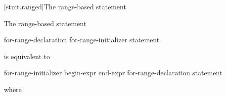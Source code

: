 [stmt.ranged]{The range-based  statement}%

\pnum
The range-based  statement

\begin{ncbnf}
 for-range-declaration \terminal{:} for-range-initializer \terminal{)} statement
\end{ncbnf}

is equivalent to

\begin{ncbnftab}
\terminal{\{}\br
\> for-range-initializer \terminal{;}\br
\> begin-expr \terminal{;}\br
\> end-expr \terminal{;}\br
\>\br
\>\>for-range-declaration \br
\>\>statement\br
\>\terminal{\}}\br
\terminal{\}}
\end{ncbnftab}

where


